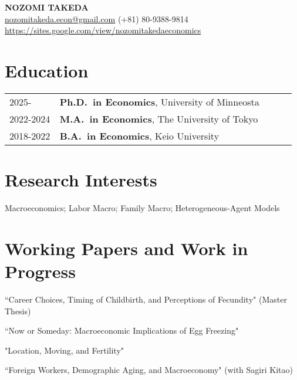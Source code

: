 \documentclass[11pt]{article}
\begin{document}
\begin{center}
    {\LARGE \bfseries NOZOMI TAKEDA}\\[4pt]
    \href{mailto:nozomitakeda.econ@gmail.com}{nozomitakeda.econ@gmail.com} (+81) 80-9388-9814\\
    \url{https://sites.google.com/view/nozomitakedaeconomics}
\end{center}
\vspace{4pt}

\section*{Education}
\begin{tabular}{p{0.17\linewidth} p{0.80\linewidth}}
2025-            & \textbf{Ph.D.\ in Economics}, University of Minneosta\\[2pt]
2022-2024        & \textbf{M.A.\ in Economics}, The University of Tokyo\\[2pt]
2018-2022        & \textbf{B.A.\ in Economics}, Keio University\\
\end{tabular}

\section*{Research Interests}
Macroeconomics; Labor Macro; Family Macro; Heterogeneous-Agent Models

\section*{Working Papers and Work in Progress}
\begin{enumerate}[label={[\arabic*]}, leftmargin=*]
    \item “Career Choices, Timing of Childbirth, and Perceptions of Fecundity" (Master Thesis)
    \item “Now or Someday: Macroeconomic Implications of Egg Freezing"
    \item "Location, Moving, and Fertility"
    \item “Foreign Workers, Demographic Aging, and Macroeconomy" (with Sagiri Kitao)
\end{enumerate}
\end{document}
